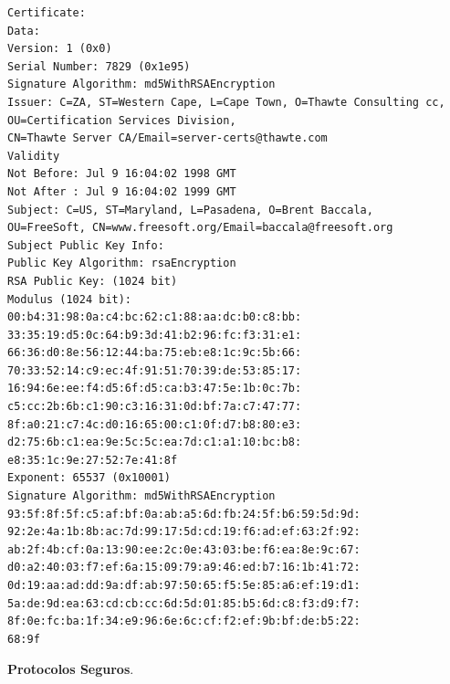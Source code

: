 \documentclass[a4paper,11pt]{article}
\begin{document}
\begin{verbatim}
Certificate:
Data:
Version: 1 (0x0)
Serial Number: 7829 (0x1e95)
Signature Algorithm: md5WithRSAEncryption
Issuer: C=ZA, ST=Western Cape, L=Cape Town, O=Thawte Consulting cc,
OU=Certification Services Division,
CN=Thawte Server CA/Email=server-certs@thawte.com
Validity
Not Before: Jul 9 16:04:02 1998 GMT
Not After : Jul 9 16:04:02 1999 GMT
Subject: C=US, ST=Maryland, L=Pasadena, O=Brent Baccala,
OU=FreeSoft, CN=www.freesoft.org/Email=baccala@freesoft.org
Subject Public Key Info:
Public Key Algorithm: rsaEncryption
RSA Public Key: (1024 bit)
Modulus (1024 bit):
00:b4:31:98:0a:c4:bc:62:c1:88:aa:dc:b0:c8:bb:
33:35:19:d5:0c:64:b9:3d:41:b2:96:fc:f3:31:e1:
66:36:d0:8e:56:12:44:ba:75:eb:e8:1c:9c:5b:66:
70:33:52:14:c9:ec:4f:91:51:70:39:de:53:85:17:
16:94:6e:ee:f4:d5:6f:d5:ca:b3:47:5e:1b:0c:7b:
c5:cc:2b:6b:c1:90:c3:16:31:0d:bf:7a:c7:47:77:
8f:a0:21:c7:4c:d0:16:65:00:c1:0f:d7:b8:80:e3:
d2:75:6b:c1:ea:9e:5c:5c:ea:7d:c1:a1:10:bc:b8:
e8:35:1c:9e:27:52:7e:41:8f
Exponent: 65537 (0x10001)
Signature Algorithm: md5WithRSAEncryption
93:5f:8f:5f:c5:af:bf:0a:ab:a5:6d:fb:24:5f:b6:59:5d:9d:
92:2e:4a:1b:8b:ac:7d:99:17:5d:cd:19:f6:ad:ef:63:2f:92:
ab:2f:4b:cf:0a:13:90:ee:2c:0e:43:03:be:f6:ea:8e:9c:67:
d0:a2:40:03:f7:ef:6a:15:09:79:a9:46:ed:b7:16:1b:41:72:
0d:19:aa:ad:dd:9a:df:ab:97:50:65:f5:5e:85:a6:ef:19:d1:
5a:de:9d:ea:63:cd:cb:cc:6d:5d:01:85:b5:6d:c8:f3:d9:f7:
8f:0e:fc:ba:1f:34:e9:96:6e:6c:cf:f2:ef:9b:bf:de:b5:22:
68:9f
\end{verbatim}

\textbf{Protocolos Seguros}.
\end{document}
